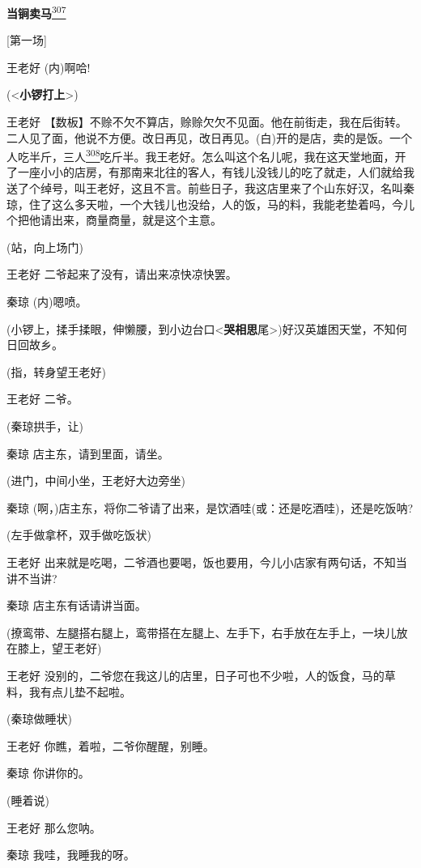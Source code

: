 \newpage
{} %
\textbf{当锏卖马}\protect\hyperlink{fn307}{\textsuperscript{307}}

{[}第一场{]}

王老好 (内)啊哈!

(\textless{}\textbf{小锣打上}\textgreater{})

王老好
【数板】不赊不欠不算店，赊赊欠欠不见面。他在前街走，我在后街转。二人见了面，他说不方便。改日再见，改日再见。(白)开的是店，卖的是饭。一个人吃半斤，三人\protect\hyperlink{fn308}{\textsuperscript{308}}吃斤半。我王老好。怎么叫这个名儿呢，我在这天堂地面，开了一座小小的店房，有那南来北往的客人，有钱儿没钱儿的吃了就走，人们就给我送了个绰号，叫王老好，这且不言。前些日子，我这店里来了个山东好汉，名叫秦琼，住了这么多天啦，一个大钱儿也没给，人的饭，马的料，我能老垫着吗，今儿个把他请出来，商量商量，就是这个主意。

(站，向上场门)

王老好 二爷起来了没有，请出来凉快凉快罢。

秦琼 (内)嗯喷。

(小锣上，揉手揉眼，伸懒腰，到小边台口\textless{}\textbf{哭相思}尾\textgreater{})好汉英雄困天堂，不知何日回故乡。

(指，转身望王老好)

王老好 二爷。

(秦琼拱手，让)

秦琼 店主东，请到里面，请坐。

(进门，中间小坐，王老好大边旁坐)

秦琼
(啊，)店主东，将你二爷请了出来，是饮酒哇(或：还是吃酒哇)，还是吃饭呐?

(左手做拿杯，双手做吃饭状)

王老好
出来就是吃喝，二爷酒也要喝，饭也要用，今儿小店家有两句话，不知当讲不当讲?

秦琼 店主东有话请讲当面。

(撩鸾带、左腿搭右腿上，鸾带搭在左腿上、左手下，右手放在左手上，一块儿放在膝上，望王老好)

王老好
没别的，二爷您在我这儿的店里，日子可也不少啦，人的饭食，马的草料，我有点儿垫不起啦。

(秦琼做睡状)

王老好 你瞧，着啦，二爷你醒醒，别睡。

秦琼 你讲你的。

(睡着说)

王老好 那么您呐。

秦琼 我哇，我睡我的呀。

